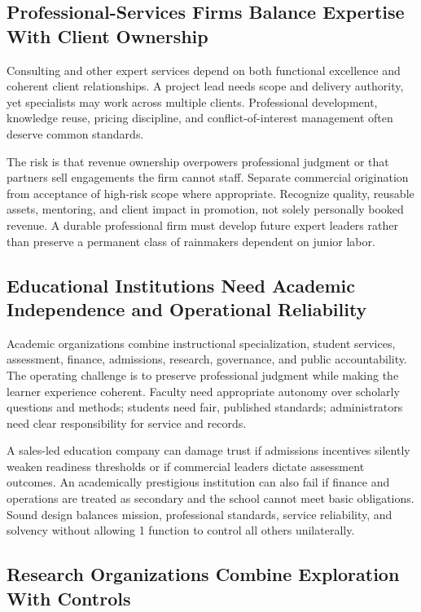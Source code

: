 \subsection{Professional-Services Firms Balance Expertise With Client Ownership}
\label{sec:professional_services_balance}

Consulting and other expert services depend on both functional excellence and coherent client relationships. A project lead needs scope and delivery authority, yet specialists may work across multiple clients. Professional development, knowledge reuse, pricing discipline, and conflict-of-interest management often deserve common standards.

The risk is that revenue ownership overpowers professional judgment or that partners sell engagements the firm cannot staff. Separate commercial origination from acceptance of high-risk scope where appropriate. Recognize quality, reusable assets, mentoring, and client impact in promotion, not solely personally booked revenue. A durable professional firm must develop future expert leaders rather than preserve a permanent class of rainmakers dependent on junior labor.

\subsection{Educational Institutions Need Academic Independence and Operational Reliability}
\label{sec:education_academic_independence_operations}

Academic organizations combine instructional specialization, student services, assessment, finance, admissions, research, governance, and public accountability. The operating challenge is to preserve professional judgment while making the learner experience coherent. Faculty need appropriate autonomy over scholarly questions and methods; students need fair, published standards; administrators need clear responsibility for service and records.

A sales-led education company can damage trust if admissions incentives silently weaken readiness thresholds or if commercial leaders dictate assessment outcomes. An academically prestigious institution can also fail if finance and operations are treated as secondary and the school cannot meet basic obligations. Sound design balances mission, professional standards, service reliability, and solvency without allowing 1 function to control all others unilaterally.

\subsection{Research Organizations Combine Exploration With Controls}
\label{sec:research_orgs_exploration_controls}

